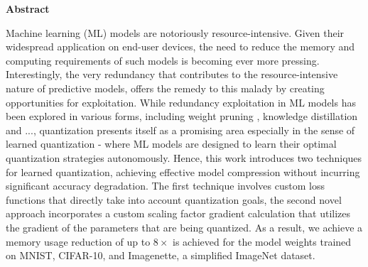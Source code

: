 \thispagestyle{empty}
\vspace*{1.0cm}

\begin{center}
    \textbf{Abstract} \label{abstract}
\end{center}

\vspace*{0.5cm}

\noindent%
Machine learning (ML) models are notoriously resource-intensive.
Given their widespread application on end-user devices,
the need to reduce the memory and computing requirements of such models is becoming ever more pressing.
Interestingly, the very redundancy that contributes to the resource-intensive nature of predictive models, 
offers the remedy to this malady by creating opportunities for exploitation.
While redundancy exploitation in ML models has been explored in various forms,
including weight pruning \cite{DBLP:conf/nips/CunDS89} \cite{DBLP:conf/iclr/MolchanovTKAK17}\cite{han2016deepcompression},
knowledge distillation \cite{DBLP:journals/corr/HintonVD15} \cite{DBLP:conf/icmlt/OkadoMIKS22} and ...,
quantization presents itself as a promising 
area especially in the sense of learned quantization - 
where ML models are designed to learn their optimal quantization strategies autonomously.
Hence, this work introduces two techniques for learned quantization,
achieving effective model compression without incurring significant accuracy degradation.
The first technique involves custom loss functions that directly take into account
quantization goals, the second novel approach incorporates a custom scaling factor gradient calculation that utilizes 
the gradient of the parameters that are being quantized.
As a result, we achieve a memory usage reduction of up to \( 8 \times \) is achieved for the model weights
trained on MNIST, CIFAR-10, and Imagenette, a simplified ImageNet dataset. 